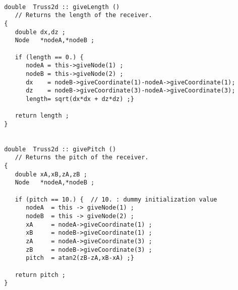 \documentclass[a4paper]{article}
\begin{document}
 \begin{verbatim}

 double  Truss2d :: giveLength ()
    // Returns the length of the receiver.
 {
    double dx,dz ;
    Node   *nodeA,*nodeB ;

    if (length == 0.) {
       nodeA = this->giveNode(1) ;
       nodeB = this->giveNode(2) ;
       dx    = nodeB->giveCoordinate(1)-nodeA->giveCoordinate(1);
       dz    = nodeB->giveCoordinate(3)-nodeA->giveCoordinate(3);
       length= sqrt(dx*dx + dz*dz) ;}

    return length ;
 }


 double  Truss2d :: givePitch ()
    // Returns the pitch of the receiver.
 {
    double xA,xB,zA,zB ;
    Node   *nodeA,*nodeB ;

    if (pitch == 10.) {  // 10. : dummy initialization value
       nodeA  = this -> giveNode(1) ;
       nodeB  = this -> giveNode(2) ;
       xA     = nodeA->giveCoordinate(1) ;
       xB     = nodeB->giveCoordinate(1) ;
       zA     = nodeA->giveCoordinate(3) ;
       zB     = nodeB->giveCoordinate(3) ;
       pitch  = atan2(zB-zA,xB-xA) ;}

    return pitch ;
 }

 \end{verbatim}
\end{document}
